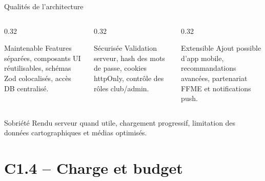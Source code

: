 \documentclass[aspectratio=169,11pt]{beamer}
\begin{document}
\begin{frame}{Qualités de l'architecture}
  \begin{columns}[T]
    \begin{column}{0.32\textwidth}
      \begin{block}{Maintenable}
        \small
        Features séparées, composants UI réutilisables, schémas Zod colocalisés, accès DB centralisé.
      \end{block}
    \end{column}
    \begin{column}{0.32\textwidth}
      \begin{block}{Sécurisée}
        \small
        Validation serveur, hash des mots de passe, cookies httpOnly, contrôle des rôles club/admin.
      \end{block}
    \end{column}
    \begin{column}{0.32\textwidth}
      \begin{block}{Extensible}
        \small
        Ajout possible d'app mobile, recommandations avancées, partenariat FFME et notifications push.
      \end{block}
    \end{column}
  \end{columns}
  \vspace{0.3cm}
  \begin{block}{Sobriété}
    Rendu serveur quand utile, chargement progressif, limitation des données cartographiques et médias optimisés.
  \end{block}
\end{frame}

\section{C1.4 -- Charge et budget}
\end{document}
